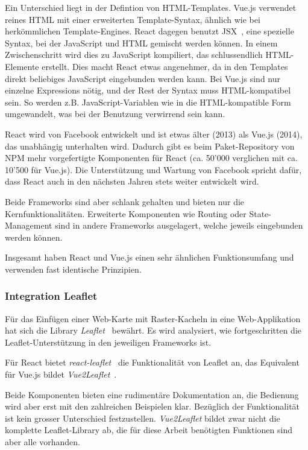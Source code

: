 Ein Unterschied liegt in der Defintion von HTML-Templates.
Vue.js verwendet reines HTML mit einer erweiterten Template-Syntax, ähnlich wie bei herkömmlichen Template-Engines.
React dagegen benutzt JSX~\cite{jsx}, eine spezielle Syntax, bei der JavaScript und HTML gemischt werden können.
In einem Zwischenschritt wird dies zu JavaScript kompiliert, das schlussendlich HTML-Elemente erstellt.
Dies macht React etwas angenehmer, da in den Templates direkt beliebiges JavaScript eingebunden werden kann.
Bei Vue.js sind nur einzelne Expressions nötig, und der Rest der Syntax muss HTML-kompatibel sein.
So werden z.B. JavaScript-Variablen wie  in die HTML-kompatible Form  umgewandelt, was bei der Benutzung verwirrend sein kann.

React wird von Facebook entwickelt und ist etwas älter (2013) als Vue.js (2014), das unabhängig unterhalten wird.
Dadurch gibt es beim Paket-Repository von NPM mehr vorgefertigte Komponenten für React (ca. 50'000 verglichen mit ca. 10'500 für Vue.js).
Die Unterstützung und Wartung von Facebook spricht dafür, dass React auch in den nächsten Jahren stets weiter entwickelt wird.

Beide Frameworks sind aber schlank gehalten und bieten nur die Kernfunktionalitäten.
Erweiterte Komponenten wie Routing oder State-Management sind in andere Frameworks ausgelagert, welche jeweils eingebunden werden können.

Insgesamt haben React und Vue.js einen sehr ähnlichen Funktionsumfang und verwenden fast identische Prinzipien.

\subsubsection{Integration Leaflet}
\label{Analyse Framework:Integration Leaflet}

Für das Einfügen einer Web-Karte mit Raster-Kacheln in eine Web-Applikation hat sich die Library \emph{Leaflet}~\cite{leaflet} bewährt.
Es wird analysiert, wie fortgeschritten die Leaflet-Unterstützung in den jeweiligen Frameworks ist.

Für React bietet \emph{react-leaflet}~\cite{react-leaflet} die Funktionalität von Leaflet an, das Equivalent für Vue.js bildet \emph{Vue2Leaflet}~\cite{vue2leaflet}.

Beide Komponenten bieten eine rudimentäre Dokumentation an, die Bedienung wird aber erst mit den zahlreichen Beispielen klar.
Bezüglich der Funktionalität ist kein grosser Unterschied festzustellen.
\emph{Vue2Leaflet} bildet zwar nicht die komplette Leaflet-Library ab, die für diese Arbeit benötigten Funktionen sind aber alle vorhanden.


